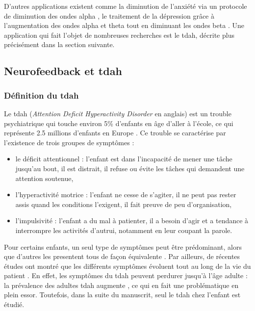 D'autres applications existent comme la diminution de l'anxiété via un protocole de diminution des ondes alpha \citep{Budzynski2009}, le traitement de la dépression
grâce à l'augmentation des ondes alpha et theta tout en diminuant les ondes beta \citep{Hurt2014}. Une application qui fait l'objet de nombreuses recherches
est le \gls{tdah}, décrite plus précisément dans la section suivante.

\subsection{Neurofeedback et \gls{tdah}}

\subsubsection{Définition du \gls{tdah}}

Le \gls{tdah} (\textit{Attention Deficit Hyperactivity Disorder} en anglais) est un trouble psychiatrique qui touche environ 5\% d'enfants en âge d'aller à l'école, 
ce qui représente 2.5 millions d'enfants en Europe \citep{DSM-5}. Ce trouble se caractérise par l'existence de trois groupes de symptômes \citep{HAS} : 
\begin{itemize}
\item le déficit attentionnel : l'enfant est dans l'incapacité de mener une tâche jusqu'au bout, il est distrait, il refuse ou évite les tâches qui demandent
une attention soutenue,
\item l'hyperactivité motrice : l'enfant ne cesse de s'agiter, il ne peut pas rester assis quand les conditions l'exigent, il fait preuve de peu d'organisation,
\item l'impulsivité : l'enfant a du mal à patienter, il a besoin d'agir et a tendance à interrompre les activités d'autrui, notamment en leur coupant la parole.
\end{itemize}
Pour certains enfants, un seul type de symptômes peut être prédominant, alors que d'autres les presentent tous de façon équivalente \citep{DSM-5}. Par ailleurs, de récentes 
études ont montré que les différents symptômes évoluent tout au long de la vie du patient \citep{CFDCAP, Epstein2013}. En effet, les symptômes du \gls{tdah}
peuvent perdurer jusqu'à l'âge adulte \citep{Faraone2006} : la prévalence des adultes \gls{tdah} augmente \citep{Chung2019}, ce qui en fait une problématique
en plein essor. Toutefois, dans la suite du manuscrit, seul le \gls{tdah} chez l'enfant est étudié. 

